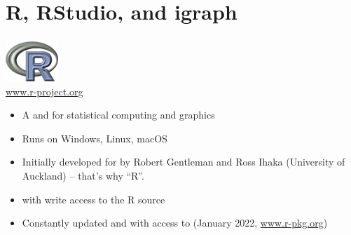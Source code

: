 \documentclass[8pt]{beamer}
\begin{document}







\section{R, RStudio, and igraph}


\bgroup
{}
\begin{frame}[plain]{}
\begin{center}
\color{white}{\Huge\insertsection}
\end{center}
\end{frame}
\egroup



\begin{frame}
\frametitle{\insertsection}

\begin{center}
    \includegraphics[height=1.5cm]{../_shared_pics/r_logo}\\
    \url{www.r-project.org}
\end{center}

\medskip
\medskip

\begin{itemize}[<+->]
\item A {\color{blue}{language}} and  {\color{blue}{environment}} for statistical computing and graphics
\item Runs on Windows, Linux, macOS
\item Initially developed for {\color{blue}{statistical analysis}} by Robert Gentleman and Ross Ihaka (University of Auckland) -- that's why ``R''.
\item {\color{blue}{Core Group}} with write access to the R source
\item Constantly updated and with access to {\color{blue}{~19,000 packages}} (January 2022, \url{www.r-pkg.org})
\end{itemize}

\end{frame}
\end{document}
